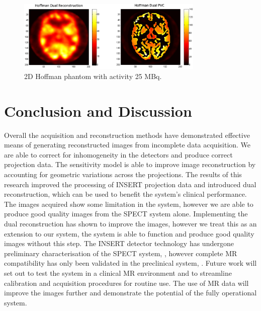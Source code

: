 \begin{figure}[!t]
\centering
\includegraphics[width=3.5in]{figures/Hoffman.png}

\caption{2D Hoffman phantom with activity 25 MBq.}
\label{fig_Hoffman}
\end{figure}


\section{Conclusion and Discussion}
Overall the acquisition and reconstruction methods have demonstrated effective means of generating reconstructed images from incomplete data acquisition. We are able to correct for inhomogeneity in the detectors and produce correct projection data. The sensitivity model is able to improve image reconstruction by accounting for geometric variations across the projections. The results of this research improved the processing of INSERT projection data and introduced dual reconstruction, which can be used to benefit the system's clinical performance.
The images acquired show some limitation in the system, however we are able to produce good quality images from the SPECT system alone. Implementing the dual reconstruction has shown to improve the images, however we treat this as an extension to our system, the system is able to function and produce good quality images without this step. The INSERT detector technology has undergone preliminary characterisation of the SPECT system, \cite{8891783}, however complete MR compatibility has only been validated in the preclinical system, \cite{8612977}. Future work will set out to test the system in a clinical MR environment and to streamline calibration and acquisition procedures for routine use. The use of MR data will improve the images further and demonstrate the potential of the fully operational system.   

